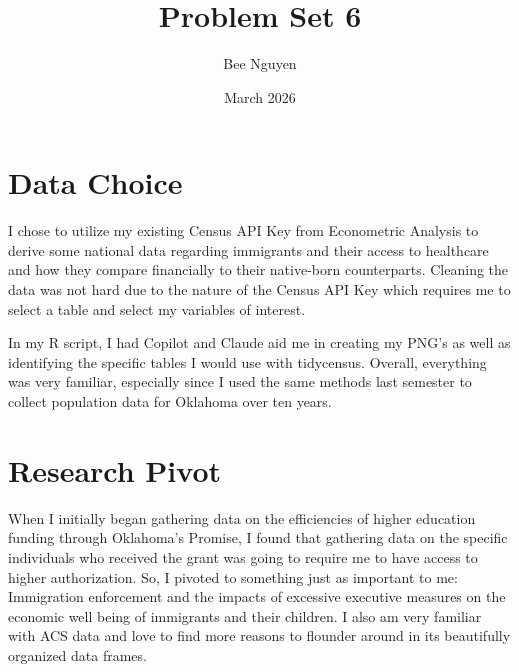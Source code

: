 \documentclass{article}
\title{Problem Set 6}
\author{Bee Nguyen}
\date{March 2026}
\begin{document}
\maketitle

\section{Data Choice}

I chose to utilize my existing Census API Key from Econometric Analysis to derive some national data regarding immigrants and their access to healthcare and how they compare financially to their native-born counterparts. Cleaning the data was not hard due to the nature of the Census API Key which requires me to select a table and select my variables of interest.  

In my R script, I had Copilot and Claude aid me in creating my PNG's as well as identifying the specific tables I would use with tidycensus. Overall, everything was very familiar, especially since I used the same methods last semester to collect population data for Oklahoma over ten years. 

\section{Research Pivot}

When I initially began gathering data on the efficiencies of higher education funding through Oklahoma's Promise, I found that gathering data on the specific individuals who received the grant was going to require me to have access to higher authorization. So, I pivoted to something just as important to me: Immigration enforcement and the impacts of excessive executive measures on the economic well being of immigrants and their children. I also am very familiar with ACS data and love to find more reasons to flounder around in its beautifully organized data frames. 
\end{document}
